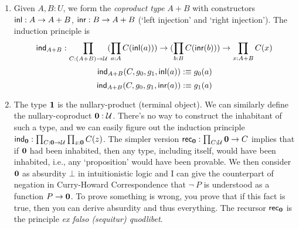 \begin{enumerate}
    \item Given $A, B:U$, we form the {\it coproduct type} $A+B$ with
    constructors $\text{\sf inl}:A\to A+B$, $\text{\sf inr}:B\to A+B$ (`left injection' and
    `right injection'). The induction principle is
    $$
        \text{\sf ind}_{A+B}: \prod_{C:(A+B)\to\mathcal{U}}
            (\prod_{a:A}C(\text{\sf inl}(a))) \to
            (\prod_{b:B}C(\text{\sf inr}(b))) \to
            \prod_{x:A+B} C(x)
    $$
    $$
        \text{\sf ind}_{A+B}(C,g_0,g_1,\text{\sf inl}(a)):\equiv g_0(a)
    $$
    $$
        \text{\sf ind}_{A+B}(C,g_0,g_1,\text{\sf inr}(a)):\equiv g_1(a)
    $$
    \item The type $\mathbf{1}$ is the nullary-product (terminal object). We 
    can similarly define the nullary-coproduct $\mathbf{0}:\mathcal{U}$. There's
    no way to construct the inhabitant of such a type, and we can easily
    figure out the induction principle 
    $\text{\sf ind}_{\mathbf{0}}: \prod_{C:\mathbf{0}\to\mathcal{U}}\prod_{z:\mathbf{0}}C(z)$. The
    simpler version $\text{\sf rec}_{\mathbf{0}}:\prod_{C:\mathcal{U}}\mathbf{0}\to C$ implies
    that if $\mathbf{0}$ had been inhabited, then any type, including itself, 
    would have been inhabited, i.e., any `proposition' would have been 
    provable. We then consider $\mathbf{0}$ as absurdity $\bot$ in intuitionistic
    logic and I can give the counterpart of negation in Curry-Howard 
    Correspondence that $\neg\ P$ is understood as a function $P\to\mathbf{0}$.
    To prove something is wrong, you prove that if this fact is true, 
    then you can derive absurdity and thus everything. The recursor 
    $\text{\sf rec}_{\mathbf{0}}$ is the principle {\it ex falso (sequitur) quodlibet}.


\end{enumerate}
